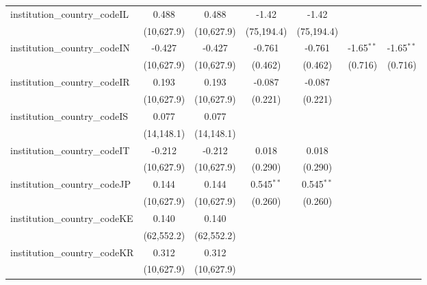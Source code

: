 \begin{tabular}{lcccccc}
   institution\_country\_codeIL          & 0.488         & 0.488         & -1.42         & -1.42         &               &   \\   
                                         & (10,627.9)    & (10,627.9)    & (75,194.4)    & (75,194.4)    &               &   \\   
   institution\_country\_codeIN          & -0.427        & -0.427        & -0.761        & -0.761        & -1.65$^{**}$  & -1.65$^{**}$\\   
                                         & (10,627.9)    & (10,627.9)    & (0.462)       & (0.462)       & (0.716)       & (0.716)\\   
   institution\_country\_codeIR          & 0.193         & 0.193         & -0.087        & -0.087        &               &   \\   
                                         & (10,627.9)    & (10,627.9)    & (0.221)       & (0.221)       &               &   \\   
   institution\_country\_codeIS          & 0.077         & 0.077         &               &               &               &   \\   
                                         & (14,148.1)    & (14,148.1)    &               &               &               &   \\   
   institution\_country\_codeIT          & -0.212        & -0.212        & 0.018         & 0.018         &               &   \\   
                                         & (10,627.9)    & (10,627.9)    & (0.290)       & (0.290)       &               &   \\   
   institution\_country\_codeJP          & 0.144         & 0.144         & 0.545$^{**}$  & 0.545$^{**}$  &               &   \\   
                                         & (10,627.9)    & (10,627.9)    & (0.260)       & (0.260)       &               &   \\   
   institution\_country\_codeKE          & 0.140         & 0.140         &               &               &               &   \\   
                                         & (62,552.2)    & (62,552.2)    &               &               &               &   \\   
   institution\_country\_codeKR          & 0.312         & 0.312         &               &               &               &   \\   
                                         & (10,627.9)    & (10,627.9)    &               &               &               &   \\   

\end{tabular}
